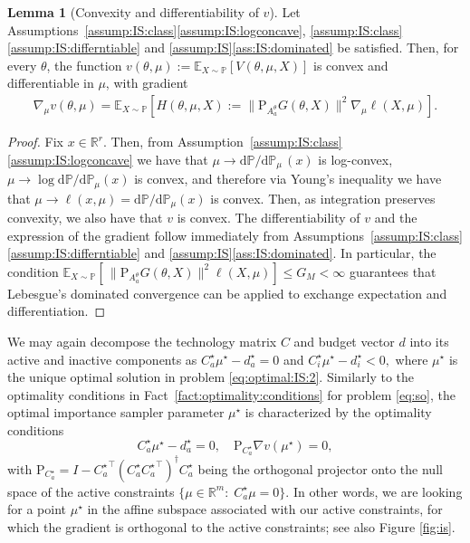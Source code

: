\documentclass[11pt,a4paper]{article}
\theoremstyle{definition}
\newtheorem{lemma}[theorem]{Lemma}
\renewcommand{\tfrac}[2]{#1/#2}
\newcommand{\mb}{\mathbb}
\renewcommand{\d}{{\mathrm d}}
\newcommand{\defn}{:=}
\begin{document}
\begin{lemma}[Convexity and differentiability of $v$]
  \label{lemma:conv:diff:V}
  Let Assumptions~\ref{assump:IS:class}\ref{assump:IS:logconcave}, \ref{assump:IS:class}\ref{assump:IS:differntiable} and \ref{assump:IS}\ref{ass:IS:dominated} be satisfied. Then, for every $\theta$, the function $v(\theta, \mu)\defn \mathbb E_{X \sim \mathbb P}\left[V(\theta, \mu, X)\right]$ is convex and differentiable in $\mu$, with gradient
  \begin{align}
    \label{eq:gradient:V}
    \nabla_\mu v(\theta, \mu)  = \mathbb E_{X \sim \mathbb P}\left[H(\theta, \mu, X):=\|\text{P}_{A_{a}^\theta}G(\theta,X)\|^2\nabla_\mu \ell(X,\mu)\right].
  \end{align}
\end{lemma}
\begin{proof}
  Fix $x \in \mathbb R^r$. Then, from Assumption~\ref{assump:IS:class}\ref{assump:IS:logconcave} we have that $\mu \to \tfrac{\d\mb P}{\d \mb P_\mu}\, (x)$ is log-convex, $\mu \to \log \tfrac{\d\mb P}{\d \mb P_\mu}(x) $ is convex, and therefore via Young's inequality we have that $\mu \to \ell(x, \mu)= \tfrac{\d\mb P}{\d \mb P_\mu}(x)$ is convex. Then, as integration preserves convexity, we also have that $v$ is convex. The differentiability of $v$ and the expression of the gradient follow immediately from Assumptions~\ref{assump:IS:class}\ref{assump:IS:differntiable} and \ref{assump:IS}\ref{ass:IS:dominated}. In particular, the condition $ \mathbb E_{X \sim \mathbb P}\left[\,\|\text{P}_{A_{a}^\theta}G(\theta,X)\|^2\ell(X,\mu)\right] \leq G_M < \infty$ guarantees that Lebesgue's dominated convergence can be applied to exchange expectation and differentiation.
\end{proof}

We may again decompose the technology matrix $C$ and budget vector $d$ into its {active} and {inactive} components as 
\(
C^\star_{a} \mu^\star - d^\star_a=0
\)
and
\(
C^\star_{i} \mu^\star -d^\star_i < 0,
\)
where $\mu^\star$ is the unique optimal solution in problem \eqref{eq:optimal:IS:2}. Similarly to the optimality conditions in Fact~\ref{fact:optimality:conditions} for problem \eqref{eq:so}, the optimal importance sampler parameter $\mu^\star$ is characterized by the optimality conditions
\[
  C^\star_a \mu^\star - d^\star_a=0, \quad \text{P}_{C^\star_a} \nabla {v}(\mu^\star)=0,
\]
with $\text{P}_{C^\star_a}= I - {C^\star_{a}}^\top ({C^\star_{a}} {C^\star_{a}}^\top)^\dagger {C^\star_{a}}$ being the orthogonal projector onto the null space of the active constraints $\{\mu \in \mathbb R^m:\; C^\star_{a} \mu = 0\}$.
In other words, we are looking for a point $\mu^\star$ in the affine subspace associated with our active constraints, for which the gradient is orthogonal to the active constraints; see also Figure \ref{fig:is}.
\end{document}
